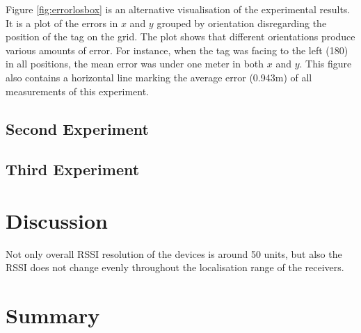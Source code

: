 Figure \ref{fig:errorlosbox} is an alternative visualisation of the experimental results. It is a plot of the errors in $x$ and $y$ grouped by orientation disregarding the position of the tag on the grid. The plot shows that different orientations produce various amounts of error. For instance, when the tag was facing to the left (180\textdegree) in all positions, the mean error was under one meter in both $x$ and $y$. This figure also contains a horizontal line marking the average error (0.943m) of all measurements of this experiment.


\subsection{Second Experiment}

\subsection{Third Experiment}

\section{Discussion}

Not only overall RSSI resolution of the devices is around 50 units, but also the RSSI does not change evenly throughout the localisation range of the receivers. 

\section{Summary}
